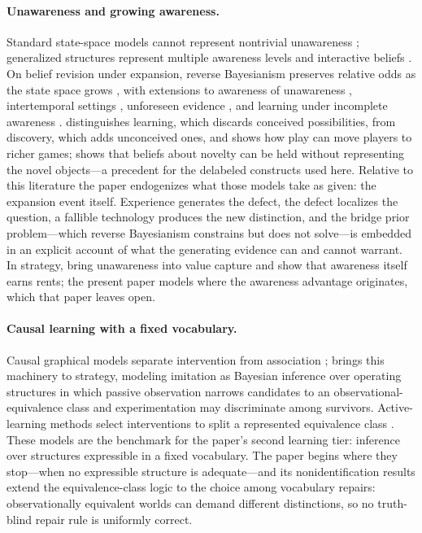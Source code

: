 \documentclass[11pt]{article}
\theoremstyle{definition}
\begin{document}
\paragraph{Unawareness and growing awareness.}
Standard state-space models cannot represent nontrivial unawareness
\citep{DekelLipmanRustichini1998}; generalized structures represent multiple
awareness levels and interactive beliefs
\citep{HeifetzMeierSchipper2006,HeifetzMeierSchipper2013}.  On belief
revision under expansion, reverse Bayesianism preserves relative odds as the
state space grows \citep{KarniViero2013}, with extensions to awareness of
unawareness \citep{KarniViero2017}, intertemporal settings \citep{Viero2021},
unforeseen evidence \citep{Piermont2021}, and learning under incomplete
awareness \citep{GrantMeneghelTourky2022}.  \citet{Schipper2021}
distinguishes learning, which discards conceived possibilities, from
discovery, which adds unconceived ones, and shows how play can move players
to richer games; \citet{Schipper2025} shows that beliefs about novelty can be
held without representing the novel objects---a precedent for the delabeled
constructs used here.  Relative to this literature the paper endogenizes what
those models take as given: the expansion event itself.  Experience generates
the defect, the defect localizes the question, a fallible technology produces
the new distinction, and the bridge prior problem---which reverse Bayesianism
constrains but does not solve---is embedded in an explicit account of what
the generating evidence can and cannot warrant.  In strategy,
\citet{BryanRyallSchipper2022} bring unawareness into value capture and show
that awareness itself earns rents; the present paper models where the
awareness advantage originates, which that paper leaves open.

\paragraph{Causal learning with a fixed vocabulary.}
Causal graphical models separate intervention from association
\citep{Pearl2009,SpirtesEtAl2000}; \citet{Ryall2009} brings this machinery to
strategy, modeling imitation as Bayesian inference over operating structures
in which passive observation narrows candidates to an
observational-equivalence class and experimentation may discriminate among
survivors.  Active-learning methods select interventions to split a
represented equivalence class \citep{HeGeng2008}.  These models are the
benchmark for the paper's second learning tier: inference over structures
expressible in a fixed vocabulary.  The paper begins where they stop---when
no expressible structure is adequate---and its nonidentification results
extend the equivalence-class logic to the choice among vocabulary repairs:
observationally equivalent worlds can demand different distinctions, so no
truth-blind repair rule is uniformly correct.
\end{document}
